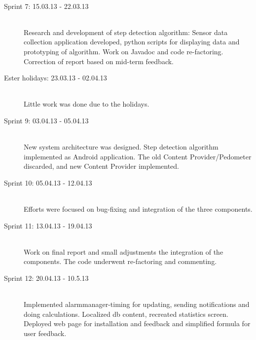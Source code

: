 \begin{description}
 \\ \noindent\makebox[\linewidth]{\rule{\textwidth}{1pt}}
  \item[Sprint 7: 15.03.13 - 22.03.13]    \hfill \\
Research and development of step detection algorithm: Sensor data collection application developed, python scripts for displaying data and prototyping of algorithm. Work on Javadoc and code re-factoring. Correction of report based on mid-term feedback.
 \\ \noindent\makebox[\linewidth]{\rule{\textwidth}{1pt}}
  \item[Ester holidays: 23.03.13 - 02.04.13]    \hfill \\
Little work was done due to the holidays.
 \\ \noindent\makebox[\linewidth]{\rule{\textwidth}{1pt}} 
 \item[Sprint 9: 03.04.13 - 05.04.13]    \hfill \\
New system architecture was designed. Step detection algorithm implemented as Android application. The old Content Provider/Pedometer discarded, and new Content Provider implemented. 
 \\ \noindent\makebox[\linewidth]{\rule{\textwidth}{1pt}} 
 \item[Sprint 10: 05.04.13 - 12.04.13]    \hfill \\
Efforts were focused on bug-fixing and integration of the three components. 
 \\ \noindent\makebox[\linewidth]{\rule{\textwidth}{1pt}}
  \item[Sprint 11: 13.04.13 - 19.04.13]    \hfill \\
Work on final report and small adjustments the integration of the components. The code underwent re-factoring and commenting. 
 \\ \noindent\makebox[\linewidth]{\rule{\textwidth}{1pt}}
 \item[Sprint 12: 20.04.13 - 10.5.13] \hfill \\
  Implemented alarmmanager-timing for updating, sending notifications and doing calculations. Localized db content, recreated statistics screen. Deployed web page for installation and feedback and simplified formula for user feedback.
 \\ \noindent\makebox[\linewidth]{\rule{\textwidth}{1pt}}
\end{description}